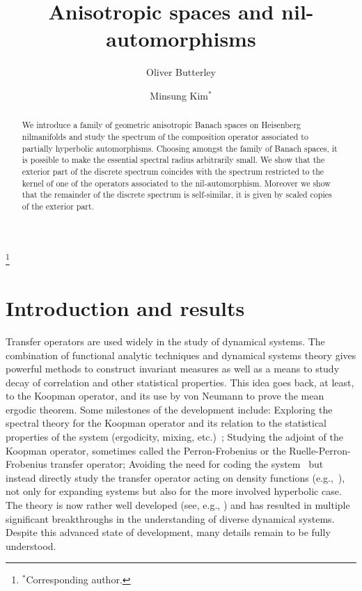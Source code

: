 \documentclass[a4paper,11pt]{amsart}
\theoremstyle{remark}
\begin{document}
\title{Anisotropic spaces and nil-automorphisms}

\author{Oliver Butterley}
\address{(Oliver Butterley) Department of Mathematics, University of Rome Tor Vergata, Via della Ricerca Scientifica, 00133 Roma, Italy}
\thanks{$^\ast$Corresponding author.}

\author{Minsung Kim$^{\ast}$}
\address{(Minsung Kim) Department of Mathematics, Pohang University of Science and Technology (POSTECH), 77 Cheongam-Ro, Nam-Gu, Pohang, Gyeongbuk, 37673 Korea}

\begin{abstract}
    We introduce a family of geometric anisotropic Banach spaces on Heisenberg nilmanifolds and study the spectrum of the composition operator associated to partially hyperbolic automorphisms.
    Choosing amongst the family of Banach spaces, it is possible to make the essential spectral radius arbitrarily small.
    We show that the exterior part of the discrete spectrum coincides with the spectrum restricted to the kernel of one of the operators associated to the nil-automorphism.
    Moreover we show that the remainder of the discrete spectrum is self-similar, it is given by scaled copies of the exterior part.
\end{abstract}

\maketitle
\thispagestyle{empty}


\section{Introduction and results}
\label{sec:results}

Transfer operators are used widely in the study of dynamical systems. 
The combination of functional analytic techniques and dynamical systems theory gives powerful methods to construct invariant measures as well as a means to study decay of correlation and other statistical properties. 
This idea goes back, at least, to the Koopman operator, and its use by von Neumann to prove the mean ergodic theorem.
Some milestones of the development include:
Exploring the spectral theory for the Koopman operator and its relation to the statistical properties of the system (ergodicity, mixing, etc.)~\cite{CFS82};
Studying the adjoint of the Koopman operator, sometimes called the Perron-Frobenius or the Ruelle-Perron-Frobenius transfer operator;
Avoiding the need for coding the system~\cite{Bowen75} but instead directly study the transfer operator acting on density functions (e.g.,~\cite{LY73, Ruelle89}), not only for expanding systems but also for the more involved hyperbolic case.
The theory is now rather well developed (see, e.g., \cite{Keller98, Baladi00, Baladi16}) and has resulted in multiple significant breakthroughs in the understanding of diverse dynamical systems. 
Despite this advanced state of development, many details remain to be fully understood.
\end{document}
